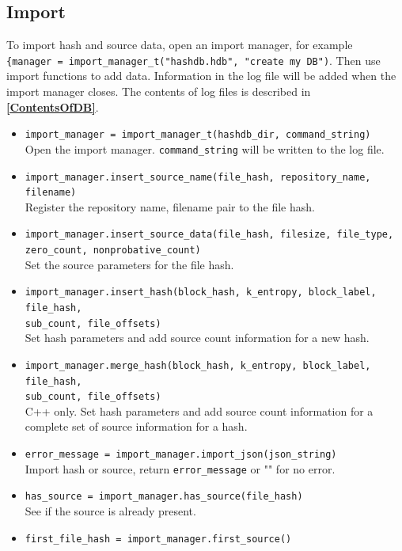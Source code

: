 \documentclass[11pt,fleqn]{article} %
\begin{document}
\subsection{Import}
To import hash and source data, open an import manager, for example\\
\verb+{manager = import_manager_t("hashdb.hdb", "create my DB")+. Then use import functions to add data. Information in the log file will be added when the import manager closes. The contents of log files is described in \textbf{\autoref{ContentsOfDB}}.\\
\begin{itemize}
\item \verb+import_manager = import_manager_t(hashdb_dir, command_string)+\\
Open the import manager. \verb+command_string+ will be written to the log file.
\item \verb+import_manager.insert_source_name(file_hash, repository_name, filename)+\\
Register the repository name, filename pair to the file hash.
\item \verb+import_manager.insert_source_data(file_hash, filesize, file_type,+\\
\verb+zero_count, nonprobative_count)+\\
Set the source parameters for the file hash.
\item \verb+import_manager.insert_hash(block_hash, k_entropy, block_label, file_hash,+\\
\verb+sub_count, file_offsets)+\\
Set hash parameters and add source count information for a new hash.
\item \verb+import_manager.merge_hash(block_hash, k_entropy, block_label, file_hash,+\\
\verb+sub_count, file_offsets)+\\
C++ only. Set hash parameters and add source count information for a complete set of source information for a hash.
\item \verb+error_message = import_manager.import_json(json_string)+\\
Import hash or source, return \verb+error_message+ or "" for no error.
\item \verb+has_source = import_manager.has_source(file_hash)+\\
See if the source is already present.
\item \verb+first_file_hash = import_manager.first_source()+\\

\end{itemize}
\end{document}
